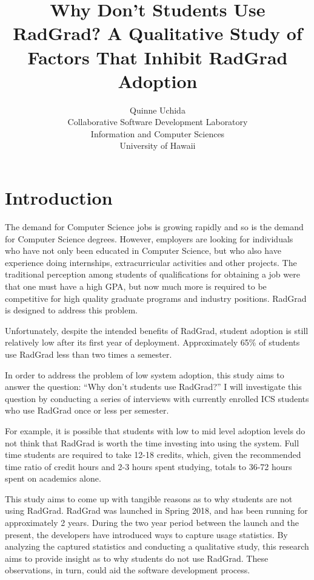 \documentclass[english]{proposalnsf}
\title{Why Don't Students Use RadGrad? A Qualitative Study of Factors That Inhibit RadGrad Adoption}
\author{Quinne Uchida \\Collaborative Software Development Laboratory \\ Information and Computer Sciences \\ University of Hawaii}
\begin{document}
\maketitle
\tableofcontents
\newpage

\section{Introduction}
\label{introduction}

The demand for Computer Science jobs is growing rapidly and so is the demand for Computer Science degrees. However, employers are looking for individuals who have not only  been educated in Computer Science, but who also have experience doing internships, extracurricular activities and other projects. The traditional perception among students of qualifications for obtaining a job were that one must have a high GPA, but now much more is required to be competitive for high quality graduate programs and industry positions. RadGrad is designed to address this problem. 

Unfortunately, despite the intended benefits of RadGrad, student adoption is still relatively low after its first year of deployment. Approximately 65{\%} of students use RadGrad less than two times a semester. 

In order to address the problem of low system adoption, this study aims to answer the question: ``Why don't students use RadGrad?'' I will investigate this question by conducting a series of interviews with currently enrolled ICS students who use RadGrad once or less per semester. 

For example, it is possible that students with low to mid level adoption levels do not think that RadGrad is worth the time investing into using the system. 
Full time students are required to take 12-18 credits, which, given the recommended time ratio of credit hours and 2-3 hours spent studying, totals to 36-72 hours spent on academics alone. 

This study aims to come up with tangible reasons as to why students are not using RadGrad. RadGrad was launched in Spring 2018, and has been running for approximately 2 years. During the two year period between the launch and the present, the developers have introduced ways to capture usage statistics. By analyzing the captured statistics and conducting a qualitative study, this research aims to provide insight as to why students do not use RadGrad. These observations, in turn, could aid the software development process. 
\end{document}
